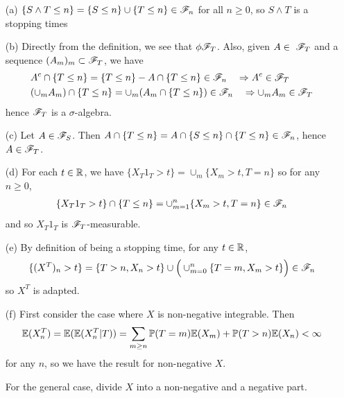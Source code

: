 \documentclass[12pt,a4paper]{report}
\newenvironment{proof}
{\begin{changemargin}{1cm}{0.5cm} 
	}%
	{\end{changemargin}
}
\begin{document}
\begin{proof}
\pf
\begin{itemize}
\item[(a)] $\{ S \wedge T \leq n \} = \{S  \leq n \} \cup \{ T \leq n\} \in \mathscr{F}_n$ for all $n\geq 0$, so $S\wedge T$ is a stopping times

\item[(b)] Directly from the definition, we see that $\phi \mathscr{F}_T$. Also, given $A\in \ \mathscr{F}_T$ and a sequence $(A_m)_m \subset \mathscr{F}_T$, we have
\begin{align*}
& A^c \cap \{T\leq n \} = \{T\leq n\} - A \cap \{T\leq n \} \in \mathscr{F}_n \quad \Rightarrow  A^c \in \mathscr{F}_T \\
&(\cup_m A_m) \cap \{T\leq n\} =  \cup_m (A_m \cap \{T\leq n\}) \in \mathscr{F}_n \quad \Rightarrow \cup_m A_m \in \mathscr{F}_T
\end{align*}
hence $\mathscr{F}_T$ is a $\sigma$-algebra.

\item[(c)] Let $A\in \mathscr{F}_S$. Then $A\cap \{T\leq n\} = A \cap \{S\leq n\} \cap \{T \leq n\} \in \mathscr{F}_n$, hence $A \in \mathscr{F}_T$.

\item[(d)] For each $t\in \mathbb{R}$, we have $\{X_T 1_T >t \} = \cup_m \{X_m >t, T=n \}$ so for any $n\geq 0$,
\begin{align*}
\{X_T 1_T >t \} \cap \{T\leq n\} = \cup_{m=1}^n \{X_m >t, T=n \} \in \mathscr{F}_n
\end{align*}
and so $X_T 1_T$ is $\mathscr{F}_T$-measurable.

\item[(e)] By definition of being a stopping time, for any $t\in \mathbb{R}$, 
\begin{align*}
\{(X^T)_n >t\} = \{T>n, X_n>t\} \cup \Big( \cup_{m=0}^n \{T=m, X_m>t \} \Big)\in \mathscr{F}_n
\end{align*}
so $X^T$ is adapted.

\item[(f)] First consider the case where $X$ is non-negative integrable. Then
\begin{align*}
\mathbb{E}(X^T_n) = \mathbb{E}(\mathbb{E}(X_n^T |T)) = \sum_{m\geq n} \mathbb{P}(T=m) \mathbb{E}(X_m) + \mathbb{P}(T>n) \mathbb{E}(X_n) < \infty
\end{align*}
for any $n$, so we have the result for non-negative $X$.

\quad For the general case, divide $X$ into a non-negative and a negative part.
\end{itemize}
\eop
\end{proof}
\s
\end{document}
